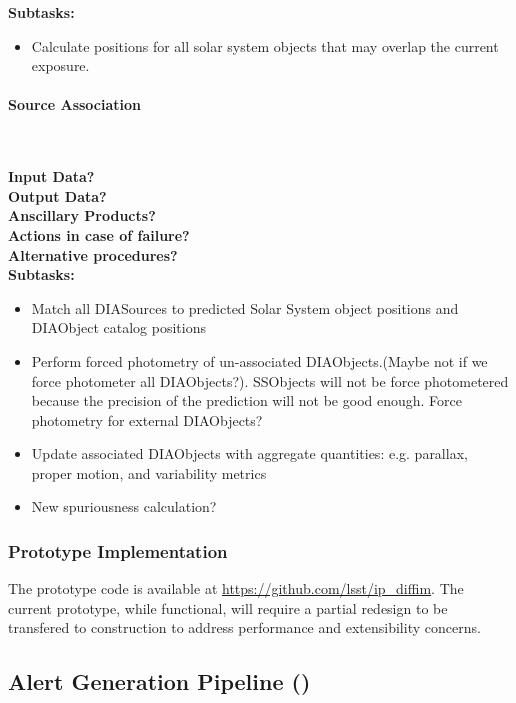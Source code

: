 \noindent
{\bf Subtasks:}
\begin{itemize}
\item Calculate positions for all solar system objects that may overlap the current exposure.
\end{itemize}

\paragraph{Source Association}~

\noindent
{\bf Input Data?}\\
{\bf Output Data?}\\
{\bf Anscillary Products?}\\
{\bf Actions in case of failure?}\\
{\bf Alternative procedures?}\\

\noindent
{\bf Subtasks:}
\begin{itemize}
\item Match all DIASources to predicted Solar System object positions and DIAObject catalog positions
\item Perform forced photometry of un-associated DIAObjects.(Maybe not if we force photometer all DIAObjects?).
SSObjects will not be force photometered because
the precision of the prediction will not be good enough.  Force photometry for external DIAObjects?
\item Update associated DIAObjects with aggregate quantities: e.g. parallax, proper motion, and variability
metrics
\item New spuriousness calculation?
\end{itemize}

\subsubsection{Prototype Implementation}

The prototype code is available at \url{https://github.com/lsst/ip_diffim}. The current prototype, while functional, will require a partial redesign to be transfered to construction to address performance and extensibility concerns.

\clearpage

\subsection{Alert Generation Pipeline (\wbsAP)}

